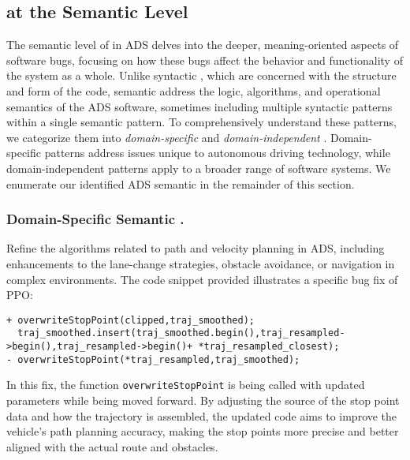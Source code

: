 \subsection{\BFPs at the Semantic Level}
\label{subsec:semantic_taxonomy}

The semantic level of \bfps in ADS delves into the deeper, meaning-oriented aspects of software bugs, focusing on how these bugs affect the behavior and functionality of the system as a whole. Unlike syntactic \bfps, which are concerned with the structure and form of the code, semantic \bfps address the logic, algorithms, and operational semantics of the ADS software, sometimes including multiple syntactic patterns within a single semantic pattern. To comprehensively understand these patterns, we categorize them into \textit{domain-specific} and \textit{domain-independent} \bfps. Domain-specific patterns address issues unique to autonomous driving technology, while domain-independent patterns apply to a broader range of software systems. 
We enumerate our identified ADS semantic \bfps in the remainder of this section.

\subsubsection{Domain-Specific Semantic \BFPs.}


Refine the algorithms related to path and velocity planning in ADS, including enhancements to the lane-change strategies, obstacle avoidance, or navigation in complex environments.
The code snippet provided illustrates a specific bug fix of PPO:

\begin{lstlisting}
+ overwriteStopPoint(clipped,traj_smoothed);
  traj_smoothed.insert(traj_smoothed.begin(),traj_resampled->begin(),traj_resampled->begin()+ *traj_resampled_closest);
- overwriteStopPoint(*traj_resampled,traj_smoothed);
\end{lstlisting}

\noindent 
In this fix, the function \texttt{overwriteStopPoint} is being called with updated parameters while being moved forward.
By adjusting the source of the stop point data and how the trajectory is assembled, the updated code aims to improve the vehicle's path planning accuracy, making the stop points more precise and better aligned with the actual route and obstacles. 

